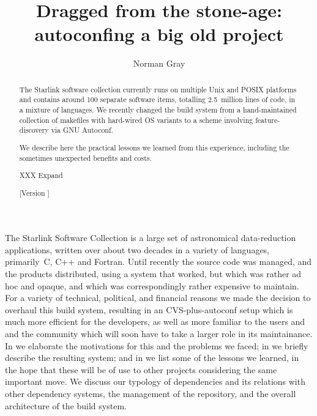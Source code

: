 \documentclass{speauth}
\begin{document}


\title{Dragged from the stone-age: autoconfing a big old project}

\author{Norman Gray\footnotemark}

\noreceived{}
\norevised{}
\noaccepted{}



\begin{abstract}
The Starlink software collection currently runs on multiple
Unix and POSIX platforms and contains around 100 separate software items,
totalling 2.5~million lines of code, in a mixture of languages.  We
recently changed the build system from a hand-maintained collection of
makefiles with hard-wired OS variants to a scheme involving
feature-discovery via GNU Autoconf.

We describe here the practical lessons we learned from this
experience, including the sometimes unexpected benefits and costs.

XXX Expand

[Version \RCSRevision]
\end{abstract}



The Starlink Software Collection \cite{draper05} is a large set of
astronomical data-reduction 
applications, written over about two decades in a variety of
languages, primarily~C, C++ and Fortran.  Until recently the source
code was managed, and the
products distributed, using a system that worked, but which was
rather ad hoc and opaque, and which was correspondingly rather
expensive to maintain.  For a variety of technical, political, and financial
reasons we made the decision to overhaul this build system, resulting
in an CVS-plus-autoconf setup which is much more efficient for the
developers, as well as more familiar to the users and and the
community which will soon have to take a larger role in its maintainance.
In  we elaborate the 
motivations for this and the problems we faced; in
 we briefly describe the resulting system; and
in  we list some of the lessons we learned, in
the hope that these will be of use to other projects considering the
same important move.  We discuss our typology of dependencies and its
relations with other dependency systems, the management of the
repository, and the overall architecture of the build system.
\end{document}
